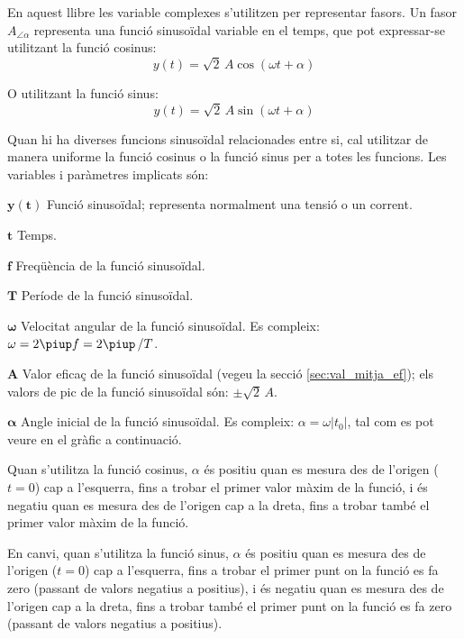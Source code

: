 \pagebreak

En aquest llibre les variable complexes s'utilitzen per representar fasors. Un fasor $A_{\angle \alpha}$ representa una funció sinusoïdal variable en el temps, que pot expressar-se utilitzant la funció cosinus:
\[y(t)=\sqrt{2}\, A \cos(\omega t + \alpha)\]

O utilitzant la funció sinus:
\[y(t)=\sqrt{2}\, A \sin(\omega t + \alpha)\]

Quan hi ha diverses funcions sinusoïdal relacionades entre si, cal utilitzar de manera uniforme la funció cosinus o la funció sinus per a totes les funcions. Les variables i paràmetres implicats són:
\begin{list}{}
{\setlength{\labelwidth}{15mm} \setlength{\leftmargin}{20mm}
\setlength{\labelsep}{5mm}}
    \item[$\boldsymbol{y(t)}$] Funció sinusoïdal; representa normalment una tensió o un corrent.
    \item[$\boldsymbol{t}$] Temps.
    \item[$\boldsymbol{f}$] Freqüència de la funció sinusoïdal.
    \item[$\boldsymbol{T}$] Període de la funció sinusoïdal.
    \item[$\boldsymbol{\omega}$] Velocitat angular de la funció sinusoïdal. Es compleix: $\omega = 2 \piup f = 2 \piup\,/T$.
    \item[$\boldsymbol{A}$] Valor eficaç de la funció sinusoïdal (vegeu la secció \vref{sec:val_mitja_ef}); els valors de pic de la funció sinusoïdal  són:  $\pm\sqrt{2}\, A$.
    \item[$\boldsymbol{\alpha}$] Angle inicial de la funció sinusoïdal. Es compleix:  $\alpha=\omega |t_0|$, tal com es pot veure en el gràfic a continuació.

    Quan s'utilitza la funció cosinus, $\alpha$ és positiu quan es mesura des de l'origen ($t=0$) cap a l'esquerra, fins a trobar el primer valor màxim de la funció, i és negatiu quan es mesura des de l'origen cap a la dreta, fins a trobar també el primer valor màxim de la funció.

    En canvi, quan s'utilitza la funció sinus, $\alpha$ és positiu quan es mesura des de l'origen ($t=0$) cap a l'esquerra, fins a trobar el primer punt on la funció es fa zero (passant de valors negatius a positius), i és negatiu quan es mesura des de l'origen cap a la dreta, fins a trobar també el primer punt on la funció es fa zero (passant de valors negatius a positius).
    \item[] 
\end{list}

